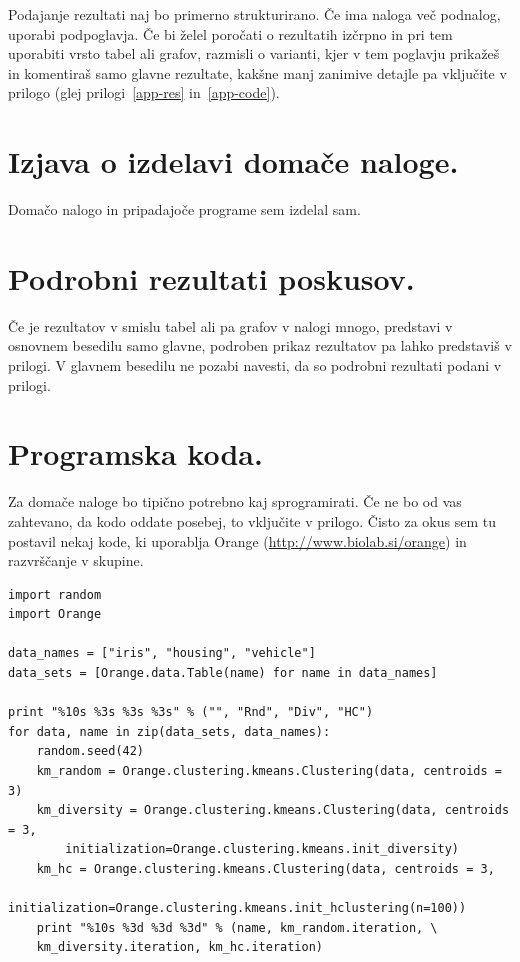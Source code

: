 \documentclass[a4paper,11pt]{article}
\begin{document}
Podajanje rezultati naj bo primerno strukturirano. Če ima naloga več
podnalog, uporabi podpoglavja. Če bi želel poročati o rezultatih
izčrpno in pri tem uporabiti vrsto tabel ali grafov, razmisli o
varianti, kjer v tem poglavju prikažeš in komentiraš samo glavne
rezultate, kakšne manj zanimive detajle pa vključite v prilogo (glej
prilogi~\ref{app-res} in~\ref{app-code}).

\section{Izjava o izdelavi domače naloge.}
Domačo nalogo in pripadajoče programe sem izdelal sam.

\appendix
\appendixpage
\section{\label{app-res}Podrobni rezultati poskusov.}

Če je rezultatov v smislu tabel ali pa grafov v nalogi mnogo,
predstavi v osnovnem besedilu samo glavne, podroben prikaz
rezultatov pa lahko predstaviš v prilogi. V glavnem besedilu ne
pozabi navesti, da so podrobni rezultati podani v prilogi.

\section{\label{app-code}Programska koda.}

Za domače naloge bo tipično potrebno kaj sprogramirati. Če ne bo od
vas zahtevano, da kodo oddate posebej, to vključite v prilogo. Čisto
za okus sem tu postavil nekaj kode, ki uporablja Orange
(\url{http://www.biolab.si/orange}) in razvrščanje v skupine.


\begin{lstlisting}
import random
import Orange

data_names = ["iris", "housing", "vehicle"]
data_sets = [Orange.data.Table(name) for name in data_names]

print "%10s %3s %3s %3s" % ("", "Rnd", "Div", "HC")
for data, name in zip(data_sets, data_names):
    random.seed(42)
    km_random = Orange.clustering.kmeans.Clustering(data, centroids = 3)
    km_diversity = Orange.clustering.kmeans.Clustering(data, centroids = 3,
        initialization=Orange.clustering.kmeans.init_diversity)
    km_hc = Orange.clustering.kmeans.Clustering(data, centroids = 3,
        initialization=Orange.clustering.kmeans.init_hclustering(n=100))
    print "%10s %3d %3d %3d" % (name, km_random.iteration, \
    km_diversity.iteration, km_hc.iteration)
\end{lstlisting}
\end{document}

